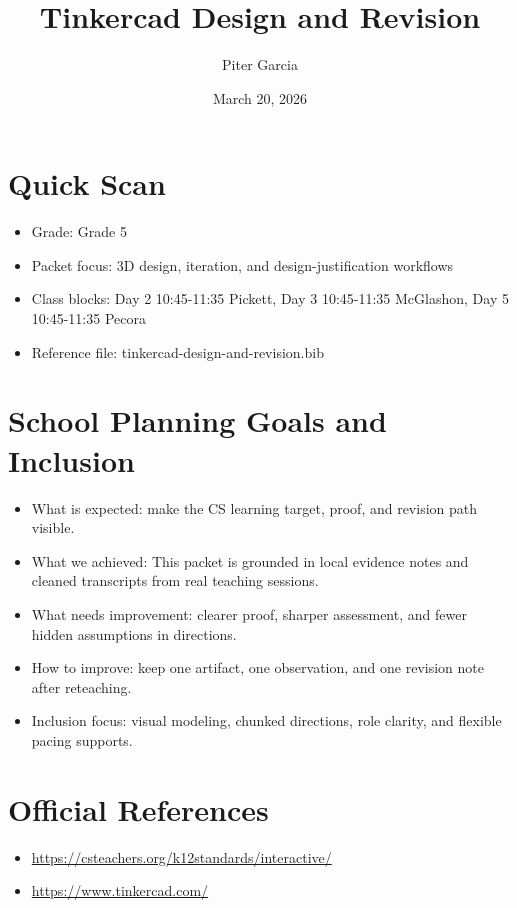 \documentclass[11pt]{article}
\title{Tinkercad Design and Revision}
\author{Piter Garcia}
\date{March 20, 2026}
\begin{document}
\maketitle
\section*{Quick Scan}
\begin{itemize}[leftmargin=*]
\item Grade: Grade 5
\item Packet focus: 3D design, iteration, and design-justification workflows
\item Class blocks: Day 2 10:45-11:35 Pickett, Day 3 10:45-11:35 McGlashon, Day 5 10:45-11:35 Pecora
\item Reference file: tinkercad-design-and-revision.bib
\end{itemize}
\section*{School Planning Goals and Inclusion}
\begin{itemize}[leftmargin=*]
\item What is expected: make the CS learning target, proof, and revision path visible.
\item What we achieved: This packet is grounded in local evidence notes and cleaned transcripts from real teaching sessions.
\item What needs improvement: clearer proof, sharper assessment, and fewer hidden assumptions in directions.
\item How to improve: keep one artifact, one observation, and one revision note after reteaching.
\item Inclusion focus: visual modeling, chunked directions, role clarity, and flexible pacing supports.
\end{itemize}
\section*{Official References}
\begin{itemize}[leftmargin=*]
\item \url{https://csteachers.org/k12standards/interactive/}
\item \url{https://www.tinkercad.com/}
\end{itemize}
\end{document}
